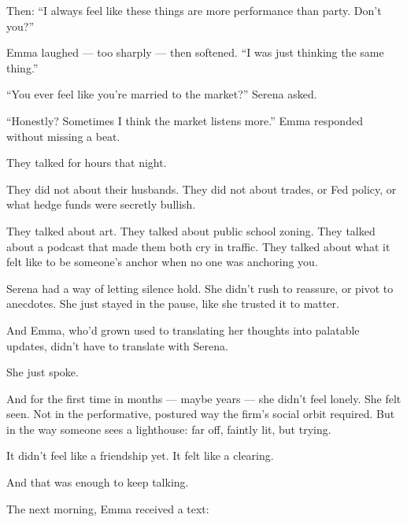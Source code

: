 Then:  
``I always feel like these things are more performance than party. Don’t you?''

Emma laughed --- too sharply --- then softened. ``I was just thinking the same thing.''

``You ever feel like you’re married to the market?'' Serena asked.

``Honestly? Sometimes I think the market listens more.'' Emma responded without missing a beat.

They talked for hours that night.

They did not about their husbands.
They did not about trades, or Fed policy, or what hedge funds were secretly bullish.

They talked about art. They talked about public school zoning. They talked about a podcast that 
made them both cry in traffic. They talked about what it felt like to be someone’s anchor when 
no one was anchoring you.

Serena had a way of letting silence hold. She didn’t rush to reassure, or pivot to anecdotes. 
She just stayed in the pause, like she trusted it to matter.

And Emma, who’d grown used to translating her thoughts into palatable updates, didn’t have 
to translate with Serena.

She just spoke.

And for the first time in months --- maybe years --- she didn’t feel lonely.
She felt seen. Not in the performative, postured way the firm’s social orbit required.
But in the way someone sees a lighthouse: far off, faintly lit, but trying.

It didn’t feel like a friendship yet.
It felt like a clearing.

And that was enough to keep talking.

The next morning, Emma received a text:


